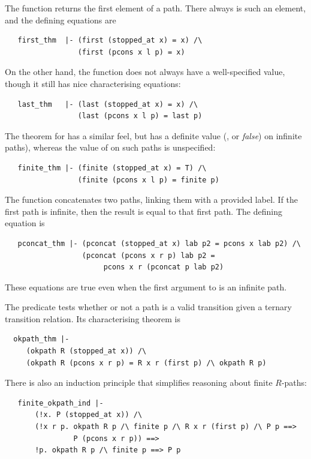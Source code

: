 {The  function returns the first element of a path.
There always is such an element, and the defining equations are
\begin{hol}
\begin{verbatim}
   first_thm  |- (first (stopped_at x) = x) /\
                 (first (pcons x l p) = x)
\end{verbatim}
\end{hol}

On the other hand, the  function does not always have a
well-specified value, though it still has nice characterising
equations:
\begin{hol}
\begin{verbatim}
   last_thm   |- (last (stopped_at x) = x) /\
                 (last (pcons x l p) = last p)
\end{verbatim}
\end{hol}

The theorem for  has a similar feel, but has a definite
value (, or \emph{false}) on infinite paths), whereas the
value of \ml{last} on such paths is unspecified:
\begin{hol}
\begin{verbatim}
   finite_thm |- (finite (stopped_at x) = T) /\
                 (finite (pcons x l p) = finite p)
\end{verbatim}
\end{hol}

The function  concatenates two paths, linking them
with a provided label.  If the first path is infinite, then the result
is equal to that first path.  The defining equation is
\begin{hol}
\begin{verbatim}
   pconcat_thm |- (pconcat (stopped_at x) lab p2 = pcons x lab p2) /\
                  (pconcat (pcons x r p) lab p2 =
                       pcons x r (pconcat p lab p2)
\end{verbatim}
\end{hol}
%
These equations are true even when the first argument to
\ml{pconcat} is an infinite path.

The  predicate tests whether or not a path is a valid
transition given a ternary transition relation.  Its characterising
theorem is
\begin{hol}
\begin{verbatim}
  okpath_thm |-
     (okpath R (stopped_at x)) /\
     (okpath R (pcons x r p) = R x r (first p) /\ okpath R p)
\end{verbatim}
\end{hol}
%
There is also an induction principle that simplifies reasoning about
finite $R$-paths:
%
\begin{hol}
\begin{verbatim}
   finite_okpath_ind |-
       (!x. P (stopped_at x)) /\
       (!x r p. okpath R p /\ finite p /\ R x r (first p) /\ P p ==>
                P (pcons x r p)) ==>
       !p. okpath R p /\ finite p ==> P p
\end{verbatim}
\end{hol}

}
